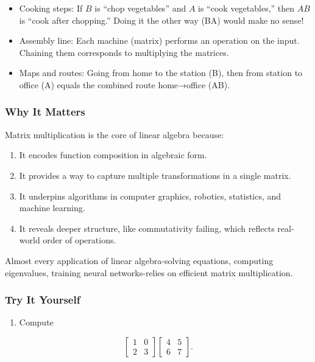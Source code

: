 \documentclass[
  letterpaper,
  DIV=11,
  numbers=noendperiod]{scrreprt}
\providecommand{\tightlist}{%
  \setlength{\itemsep}{0pt}\setlength{\parskip}{0pt}}
\begin{document}
\begin{itemize}
\tightlist
\item
  Cooking steps: If \(B\) is ``chop vegetables'' and \(A\) is ``cook
  vegetables,'' then \(AB\) is ``cook after chopping.'' Doing it the
  other way (BA) would make no sense!
\item
  Assembly line: Each machine (matrix) performs an operation on the
  input. Chaining them corresponds to multiplying the matrices.
\item
  Maps and routes: Going from home to the station (B), then from station
  to office (A) equals the combined route home→office (AB).
\end{itemize}

\subsubsection{Why It Matters}\label{why-it-matters-11}

Matrix multiplication is the core of linear algebra because:

\begin{enumerate}
\def\labelenumi{\arabic{enumi}.}
\tightlist
\item
  It encodes function composition in algebraic form.
\item
  It provides a way to capture multiple transformations in a single
  matrix.
\item
  It underpins algorithms in computer graphics, robotics, statistics,
  and machine learning.
\item
  It reveals deeper structure, like commutativity failing, which
  reflects real-world order of operations.
\end{enumerate}

Almost every application of linear algebra-solving equations, computing
eigenvalues, training neural networks-relies on efficient matrix
multiplication.

\subsubsection{Try It Yourself}\label{try-it-yourself-14}

\begin{enumerate}
\def\labelenumi{\arabic{enumi}.}
\tightlist
\item
  Compute
\end{enumerate}

\[
\begin{bmatrix} 
1 & 0 \\ 
2 & 3 
\end{bmatrix}
\begin{bmatrix} 
4 & 5 \\ 
6 & 7 
\end{bmatrix}.
\]
\end{document}
